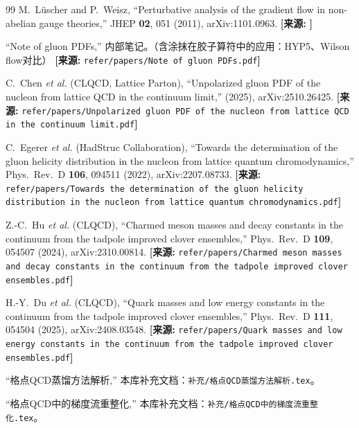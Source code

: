 \documentclass[12pt,a4paper]{ctexart}
\theoremstyle{definition}
\begin{document}
\begin{thebibliography}{99}
M.~L\"uscher and P.~Weisz,
``Perturbative analysis of the gradient flow in non-abelian gauge theories,''
JHEP \textbf{02}, 051 (2011), arXiv:1101.0963.
\quad\textbf{[来源:} \texttt{}\textbf{]}


``Note of gluon PDFs,''
内部笔记。（含涂抹在胶子算符中的应用：HYP5、Wilson flow对比）
\quad\textbf{[来源:} \texttt{refer/papers/Note of gluon PDFs.pdf}\textbf{]}

C.~Chen \textit{et al.} (CLQCD, Lattice Parton),
``Unpolarized gluon PDF of the nucleon from lattice QCD in the continuum limit,''
(2025), arXiv:2510.26425.
\quad\textbf{[来源:} \texttt{refer/papers/Unpolarized gluon PDF of the nucleon from lattice QCD in the continuum limit.pdf}\textbf{]}

C.~Egerer \textit{et al.} (HadStruc Collaboration),
``Towards the determination of the gluon helicity distribution in the nucleon from lattice quantum chromodynamics,''
Phys.\ Rev.\ D \textbf{106}, 094511 (2022), arXiv:2207.08733.
\quad\textbf{[来源:} \texttt{refer/papers/Towards the determination of the gluon helicity distribution in the nucleon from lattice quantum chromodynamics.pdf}\textbf{]}

Z.-C.~Hu \textit{et al.} (CLQCD),
``Charmed meson masses and decay constants in the continuum from the tadpole improved clover ensembles,''
Phys.\ Rev.\ D \textbf{109}, 054507 (2024), arXiv:2310.00814.
\quad\textbf{[来源:} \texttt{refer/papers/Charmed meson masses and decay constants in the continuum from the tadpole improved clover ensembles.pdf}\textbf{]}

H.-Y.~Du \textit{et al.} (CLQCD),
``Quark masses and low energy constants in the continuum from the tadpole improved clover ensembles,''
Phys.\ Rev.\ D \textbf{111}, 054504 (2025), arXiv:2408.03548.
\quad\textbf{[来源:} \texttt{refer/papers/Quark masses and low energy constants in the continuum from the tadpole improved clover ensembles.pdf}\textbf{]}


``格点QCD蒸馏方法解析,''
本库补充文档：\texttt{补充/格点QCD蒸馏方法解析.tex}。

``格点QCD中的梯度流重整化,''
本库补充文档：\texttt{补充/格点QCD中的梯度流重整化.tex}。

\end{thebibliography}
\end{document}
